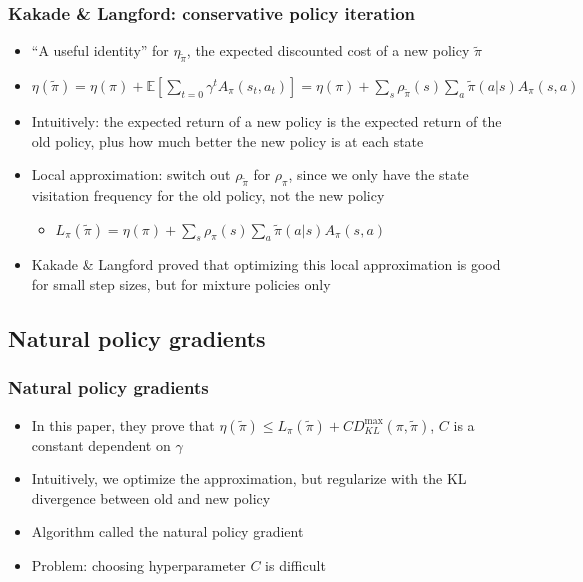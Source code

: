 \documentclass{beamer}
\begin{document}
\begin{frame}
  \frametitle{Kakade \& Langford: conservative policy iteration}
  \begin{itemize}
    \item ``A useful identity'' for $\eta_{\tilde{\pi}}$, the expected discounted cost of a new policy $\tilde{\pi}$
    \item $\eta(\tilde{\pi}) = \eta(\pi) + \mathbb{E} [ \sum_{t=0} \gamma^t A_\pi (s_t, a_t)] = \eta(\pi) + \sum_s \rho_{\tilde{\pi}} (s) \sum_a \tilde{\pi} (a|s) A_\pi (s,a)$
    \item Intuitively: the expected return of a new policy is the expected return of the old policy, plus how much better the new policy is at each state
    \item Local approximation: switch out $\rho_{\tilde{\pi}}$ for $\rho_\pi$, since we only have the state visitation frequency for the old policy, not the new policy
      \begin{itemize}
        \item $L_\pi (\tilde{\pi}) = \eta(\pi) + \sum_s \rho_\pi (s) \sum_a \tilde{\pi} (a|s) A_\pi (s,a)$
      \end{itemize}
    \item Kakade \& Langford proved that optimizing this local approximation is good for small step sizes, but for mixture policies only
  \end{itemize}
\end{frame}

\subsection{Natural policy gradients}
\begin{frame}
  \frametitle{Natural policy gradients}
  \begin{itemize}
    \item In this paper, they prove that $\eta(\tilde{\pi}) \leq L_\pi(\tilde{\pi}) + CD_{KL}^{\max} (\pi, \tilde{\pi})$, $C$ is a constant dependent on $\gamma$
    \item Intuitively, we optimize the approximation, but regularize with the KL divergence between old and new policy
    \item Algorithm called the natural policy gradient
    \item Problem: choosing hyperparameter $C$ is difficult
  \end{itemize}
\end{frame}
\end{document}
